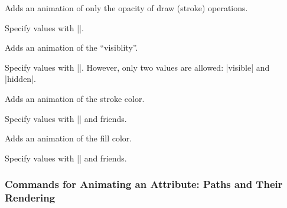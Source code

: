 \begin{command}{\pgfsys@animatestrokeopacity}
  Adds an animation of only the opacity of draw (stroke) operations.
  
  Specify values with |\pgfsys@animation@val@scalar|.
  
\begin{codeexample}[width=2cm]
\end{codeexample}
\end{command}

\begin{command}{\pgfsys@animatevisibility}
  Adds an animation of the ``visiblity''.
  
  Specify values with |\pgfsys@animation@val@text|. However, only two values are allowed:
  |visible| and |hidden|.
\begin{codeexample}[width=2cm]
\end{codeexample}
\end{command}

\begin{command}{\pgfsys@animatestrokecolor}
  Adds an animation of the stroke color.

  Specify values with |\pgfsys@animation@val@color@rgb| and friends.
\begin{codeexample}[width=2cm]
\end{codeexample}
\end{command}

\begin{command}{\pgfsys@animatefillcolor}
  Adds an animation of the fill color.
  
  Specify values with |\pgfsys@animation@val@color@rgb| and friends.
\begin{codeexample}[width=2cm]
\end{codeexample}
\end{command}


\subsubsection{Commands for Animating an Attribute: Paths and Their Rendering}

